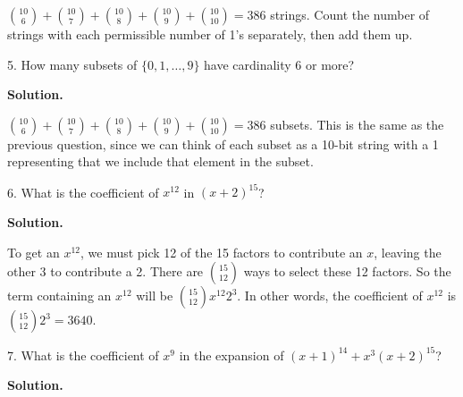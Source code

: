 \documentclass[10pt,]{book}
\theoremstyle{plain}
\theoremstyle{definition}
\theoremstyle{definition}
\theoremstyle{definition}
\numberwithin{equation}{section}
\begin{document}
\begin{exerciselist}
            \({10 \choose 6} + {10\choose 7} + {10\choose 8} + {10 \choose 9} + {10\choose 10} = 386\) strings.  Count the number of strings with each permissible number of 1's separately, then add them up.
\item[5.]\hypertarget{exercise-54}{}
            How many subsets of \(\{0,1,\ldots, 9\}\) have cardinality 6 or more?
\par\smallskip
\par\smallskip
\noindent\textbf{Solution.}\hypertarget{solution-80}{}\quad

            \({10 \choose 6} + {10\choose 7} + {10\choose 8} + {10 \choose 9} + {10\choose 10} = 386\) subsets. This is the same as the previous question, since we can think of each subset as a 10-bit string with a 1 representing that we include that element in the subset.
\item[6.]\hypertarget{exercise-55}{}
            What is the coefficient of \(x^{12}\) in \((x+2)^{15}\)?
\par\smallskip
\par\smallskip
\noindent\textbf{Solution.}\hypertarget{solution-81}{}\quad

            To get an \(x^{12}\), we must pick 12 of the 15 factors to contribute an \(x\), leaving the other 3 to contribute a 2. There are \({15 \choose 12}\) ways to select these 12 factors. So the term containing an \(x^{12}\) will be \({15 \choose 12}x^{12}2^{3}\). In other words, the coefficient of \(x^{12}\) is \({15\choose 12}2^3 = 3640\).
\item[7.]\hypertarget{exercise-56}{}
            What is the coefficient of \(x^9\) in the expansion of \((x+1)^{14} + x^3(x+2)^{15}\)?
\par\smallskip
\par\smallskip
\noindent\textbf{Solution.}\hypertarget{solution-82}{}\quad


\end{exerciselist}
\end{document}
